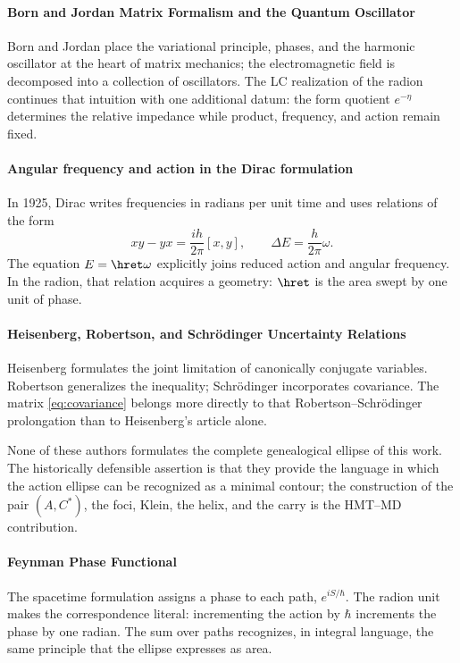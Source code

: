 \paragraph{Born and Jordan Matrix Formalism and the Quantum Oscillator}

Born and Jordan place the variational principle, phases, and the harmonic
oscillator at the heart of matrix mechanics; the electromagnetic field is
decomposed into a collection of oscillators. The LC realization of the radion
continues that intuition with one additional datum: the form quotient
\(e^{-\eta}\) determines the relative impedance while product, frequency,
and action remain fixed.

\paragraph{Angular frequency and action in the Dirac formulation}

In 1925, Dirac writes frequencies in radians per unit time and uses
relations of the form
\[
xy-yx=\frac{ih}{2\pi}[x,y],
\qquad
\Delta E=\frac{h}{2\pi}\omega.
\]
The equation \(E=\hret\omega\) explicitly joins reduced action and
angular frequency. In the radion, that relation acquires a geometry: \(\hret\)
is the area swept by one unit of phase.

\paragraph{Heisenberg, Robertson, and Schrödinger Uncertainty Relations}

Heisenberg formulates the joint limitation of canonically
conjugate variables. Robertson generalizes the inequality; Schrödinger incorporates
covariance. The matrix \eqref{eq:covariance} belongs more directly to that
Robertson--Schrödinger prolongation than to Heisenberg's article alone.

None of these authors formulates the complete genealogical ellipse of this work.
The historically defensible assertion is that they provide the language in
which the action ellipse can be recognized as a minimal contour; the
construction of the pair \((A,C^*)\), the foci, Klein, the helix, and the carry is the
HMT--MD contribution.

\paragraph{Feynman Phase Functional}

The spacetime formulation assigns a phase to each path,
\(e^{iS/\hbar}\). The radion unit makes the correspondence literal:
incrementing the action by \(\hbar\) increments the phase by one radian. The sum over
paths recognizes, in integral language, the same principle that the ellipse
expresses as area.

